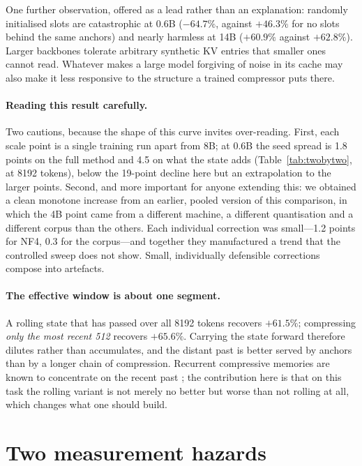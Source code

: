 \documentclass[11pt]{article}
\begin{document}
One further observation, offered as a lead rather than an explanation:
randomly initialised slots are catastrophic at 0.6B ($-64.7\%$, against
$+46.3\%$ for no slots behind the same anchors) and nearly harmless at 14B
($+60.9\%$ against $+62.8\%$). Larger backbones tolerate arbitrary synthetic KV
entries that smaller ones cannot read. Whatever makes a large model forgiving of
noise in its cache may also make it less responsive to the structure a trained
compressor puts there.

\paragraph{Reading this result carefully.}
Two cautions, because the shape of this curve invites over-reading. First, each
scale point is a single training run apart from 8B; at 0.6B the seed spread is
1.8 points on the full method and 4.5 on what the state adds
(Table~\ref{tab:twobytwo}, at 8192 tokens), below the 19-point decline here but
an extrapolation to the larger points.
Second, and more important for anyone extending this: we obtained a clean
monotone increase from an earlier, pooled version of this comparison, in which
the 4B point came from a different machine, a different quantisation and a
different corpus than the others. Each individual correction was small---1.2
points for NF4, 0.3 for the corpus---and together they manufactured a trend that
the controlled sweep does not show. Small, individually defensible corrections
compose into artefacts.

\paragraph{The effective window is about one segment.}
A rolling state that has passed over all 8192 tokens recovers $+61.5\%$;
compressing \emph{only the most recent 512} recovers $+65.6\%$. Carrying the
state forward therefore dilutes rather than accumulates, and the distant past is
better served by anchors than by a longer chain of compression. Recurrent
compressive memories are known to concentrate on the recent past
\citep{compressive,lcirc}; the contribution here is that on this task the rolling
variant is not merely no better but worse than not rolling at all, which changes
what one should build.

\section{Two measurement hazards}
\label{sec:hazards}
\end{document}
